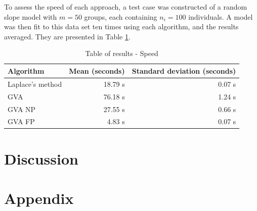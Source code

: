\documentclass{article}[12pt]
\begin{document}




To assess the speed of each approach, a test case was constructed of a random slope model with $m=50$ groups,
each containing $n_i = 100$ individuals. A model was then fit to this data set ten times using each algorithm,
and the results averaged. They are presented in Table \ref{tab:application_slope_speed}.

\begin{table}
\caption{Table of results - Speed}
\label{tab:application_slope_speed}
\begin{tabular}{|l|rr|}
\hline
Algorithm & Mean (seconds) & Standard deviation (seconds) \\
\hline
Laplace's method & 18.79 s & 0.07 s \\
GVA & 76.18 s & 1.24 s \\
GVA NP & 27.55 s & 0.66 s \\
GVA FP & 4.83 s & 0.07 s \\
\hline
\end{tabular}
\end{table}

\section{Discussion}


\newpage
\section{Appendix} 
\end{document}

